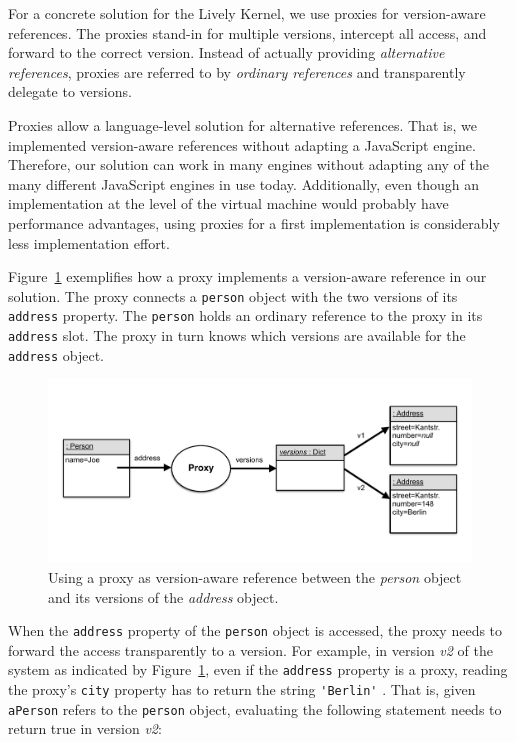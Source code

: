 For a concrete solution for the Lively Kernel, we use proxies for version-aware references.
The proxies stand-in for multiple versions, intercept all access, and forward to the correct version.
Instead of actually providing \emph{alternative references}, proxies are referred to by \emph{ordinary references} and transparently delegate to versions. 

Proxies allow a language-level solution for alternative references.
That is, we implemented version-aware references without adapting a JavaScript engine.
Therefore, our solution can work in many engines without adapting any of the many different JavaScript engines in use today.
Additionally, even though an implementation at the level of the virtual machine would probably have performance advantages, using proxies for a first implementation is considerably less implementation effort.

Figure~\ref{fig:ProxyBasedVersionAwareReference} exemplifies how a proxy implements a version-aware reference in our solution.
The proxy connects a \lstinline{person} object with the two versions of its \lstinline{address} property.
The \lstinline{person} holds an ordinary reference to the proxy in its \lstinline{address} slot.
The proxy in turn knows which versions are available for the \lstinline{address} object.

\begin{figure}[h]
    \centering
    \includegraphics[width=\textwidth]{figures/4_approach/7_proxyBasedVersionAwareReference.pdf}
    \caption{Using a proxy as version-aware reference between the \emph{person} object and its versions of the \emph{address} object.}
    \label{fig:ProxyBasedVersionAwareReference}
\end{figure}

When the \lstinline{address} property of the \lstinline{person} object is accessed, the proxy needs to forward the access transparently to a version.
For example, in version \emph{v2} of the system as indicated by Figure~\ref{fig:ProxyBasedVersionAwareReference}, even if the \lstinline{address} property is a proxy, reading the proxy's \lstinline{city} property has to return the string \lstinline{'Berlin'} .
That is, given \lstinline{aPerson} refers to the \lstinline{person} object, evaluating the following statement needs to return true in version \emph{v2}:

